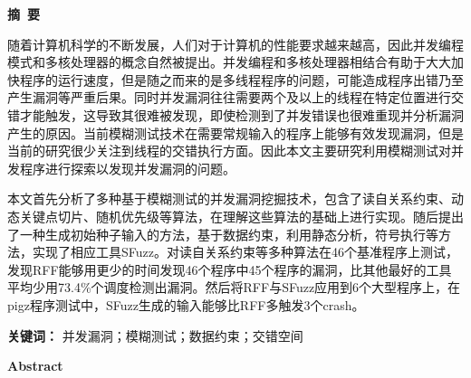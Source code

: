 \cleardoublepage{}
\begin{center}
    \bfseries {} 摘~要
\end{center}

随着计算机科学的不断发展，人们对于计算机的性能要求越来越高，因此并发编程模式和多核处理器的概念自然被提出。并发编程和多核处理器相结合有助于大大加快程序的运行速度，但是随之而来的是多线程程序的问题，可能造成程序出错乃至产生漏洞等严重后果。同时并发漏洞往往需要两个及以上的线程在特定位置进行交错才能触发，这导致其很难被发现，即使检测到了并发错误也很难重现并分析漏洞产生的原因。当前模糊测试技术在需要常规输入的程序上能够有效发现漏洞，但是当前的研究很少关注到线程的交错执行方面。因此本文主要研究利用模糊测试对并发程序进行探索以发现并发漏洞的问题。

本文首先分析了多种基于模糊测试的并发漏洞挖掘技术，包含了读自关系约束、动态关键点切片、随机优先级等算法，在理解这些算法的基础上进行实现。随后提出了一种生成初始种子输入的方法，基于数据约束，利用静态分析，符号执行等方法，实现了相应工具SFuzz。对读自关系约束等多种算法在46个基准程序上测试，发现RFF能够用更少的时间发现46个程序中45个程序的漏洞，比其他最好的工具平均少用73.4\%个调度检测出漏洞。然后将RFF与SFuzz应用到6个大型程序上，在pigz程序测试中，SFuzz生成的输入能够比RFF多触发3个crash。


\textbf{关键词：} 并发漏洞；模糊测试；数据约束；交错空间

\cleardoublepage{}
\begin{center}
    \bfseries {} Abstract
\end{center}

